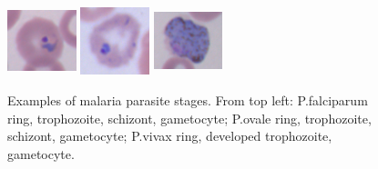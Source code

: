 \documentclass[final,a4paper,12pt,english]{UnicaPhdThesis3}
\begin{document}
\begin{figure}[t]
		\includegraphics[width=2cm, height=2cm]{images/malaria/vivax_1_ring}
		\includegraphics[width=2cm, height=2cm]{images/malaria/vivax_2c_trophozoiteDeveloped}
		\includegraphics[width=2cm, height=2cm]{images/malaria/vivax_4_gametocyte}
		\caption{\label{fig6_malaria_stages}Examples of malaria parasite stages. From top left: P.falciparum ring, trophozoite, schizont, gametocyte;
			P.ovale ring, trophozoite, schizont, gametocyte; P.vivax ring, developed trophozoite, gametocyte. \cite{Loddo2018}}
	\end{figure}
	
\end{document}
